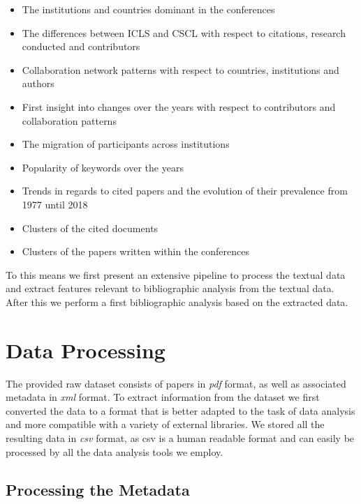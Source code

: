 \documentclass[article,twocolumn]{IEEEtran}
\providecommand{\tightlist}{%
      \setlength{\itemsep}{0pt}\setlength{\parskip}{0pt}}
\begin{document}
\begin{itemize}
\tightlist
\item
  The institutions and countries dominant in the conferences
\item
  The differences between ICLS and CSCL with respect to citations,
  research conducted and contributors
\item
  Collaboration network patterns with respect to countries, institutions
  and authors
\item
  First insight into changes over the years with respect to contributors
  and collaboration patterns
\item
  The migration of participants across institutions
\item
  Popularity of keywords over the years
\item
  Trends in regards to cited papers and the evolution of their
  prevalence from 1977 until 2018
\item
  Clusters of the cited documents
\item
  Clusters of the papers written within the conferences
\end{itemize}

To this means we first present an extensive pipeline to process the
textual data and extract features relevant to bibliographic analysis
from the textual data. After this we perform a first bibliographic
analysis based on the extracted data.

    \hypertarget{data-processing}{%
\section{Data Processing}\label{data-processing}}

    The provided raw dataset consists of papers in \emph{pdf} format, as
well as associated metadata in \emph{xml} format. To extract information
from the dataset we first converted the data to a format that is better
adapted to the task of data analysis and more compatible with a variety
of external libraries. We stored all the resulting data in \emph{csv}
format, as csv is a human readable format and can easily be processed by
all the data analysis tools we employ.

    \hypertarget{processing-the-metadata}{%
\subsection{Processing the Metadata}\label{processing-the-metadata}}
\end{document}
